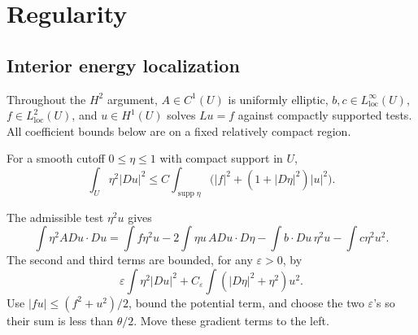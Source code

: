 \Needspace{65mm}
\section{Regularity}
\label{sec:6-3}
\subsection{Interior energy localization}
Throughout the $H^2$ argument, $A\in C^1(U)$ is uniformly elliptic,
$b,c\in L^\infty_{\mathrm{loc}}(U)$, $f\in L^2_{\mathrm{loc}}(U)$, and
$u\in H^1(U)$ solves $Lu=f$ against compactly supported tests.
All coefficient bounds below are on a fixed relatively compact region.

\begin{lemma}\label{lem:6-caccioppoli}
For a smooth cutoff $0\leq\eta\leq1$ with compact support in $U$,
\[
 \int_U\eta^2|Du|^2
 \leq C\int_{\operatorname{supp}\eta}
 \bigl(|f|^2+(1+|D\eta|^2)|u|^2\bigr).
\]
\end{lemma}
\begin{expandedproof}
The admissible test $\eta^2u$ gives
\[
 \int\eta^2 A Du\cdot Du
 =\int f\eta^2u-2\int\eta u\, A Du\cdot D\eta
       -\int b\cdot Du\,\eta^2u-\int c\eta^2u^2.
\]
The second and third terms are bounded, for any $\varepsilon>0$, by
\[
 \varepsilon\int\eta^2|Du|^2+
 C_\varepsilon\int(|D\eta|^2+\eta^2)u^2.
\]
Use $|fu|\leq(f^2+u^2)/2$, bound the potential term, and choose
the two $\varepsilon$'s so their sum is less than $\theta/2$.
Move these gradient terms to the left.
\end{expandedproof}
\Needspace{45mm}

\Needspace{35mm}

